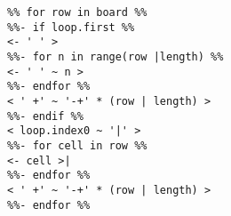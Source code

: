 \begin{verbatim}
%% for row in board %%
%%- if loop.first %%
<- ' ' >
%%- for n in range(row |length) %%
<- ' ' ~ n >
%%- endfor %%
< ' +' ~ '-+' * (row | length) >
%%- endif %%
< loop.index0 ~ '|' >
%%- for cell in row %%
<- cell >|
%%- endfor %%
< ' +' ~ '-+' * (row | length) >
%%- endfor %%
\end{verbatim}

